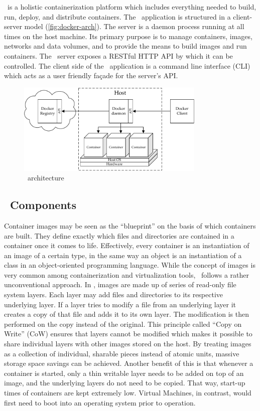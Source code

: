 \docker\ is a holistic containerization platform which includes everything needed to build, run, deploy, and distribute containers. The \docker\ application is structured in a client-server model (\cf \autoref{fig:docker-arch}). The server is a daemon process running at all times on the host machine. Its primary purpose is to manage containers, images, networks and data volumes, and to provide the means to  build images and run containers. The \docker\ server exposes a RESTful HTTP API by which it can be controlled. The client side of the \docker\ application is a command line interface (CLI) which acts as a user friendly façade for the server's API.

\begin{figure}[htpb]
  \centering
  \includegraphics[width=0.8\textwidth]{figures/docker-arch.pdf}
  \caption[\docker\ architecture]{\docker\ architecture}\label{fig:docker-arch}
\end{figure}

\subsection{\docker\ Components}
Container images may be seen as the ``blueprint'' on the basis of which containers are built. They define exactly which files and directories are contained in a container once it comes to life. Effectively, every container is an instantiation of an image of a certain type, in the same way an object is an instantiation of a class in an object-oriented programming language. While the concept of images is very common among containerization and virtualization tools, \docker\ follows a rather unconventional approach. In \docker , images are made up of series of read-only file system layers. Each layer may add files and directories to its respective underlying layer. If a layer tries to modify a file from an underlying layer it creates a copy of that file and adds it to its own layer. The modification is then performed on the copy instead of the original. This principle called ``Copy on Write'' (CoW) ensures that layers cannot be modified which makes it possible to share individual layers with other images stored on the host. By treating images as a collection of individual, sharable pieces instead of atomic units, massive storage space savings can be achieved. Another benefit of this is that whenever a container is started, only a thin writable layer needs to be added on top of an image, and the underlying layers do not need to be copied. That way, start-up times of containers are kept extremely low.  Virtual Machines, in contrast, would first need to boot into an operating system prior to operation.
